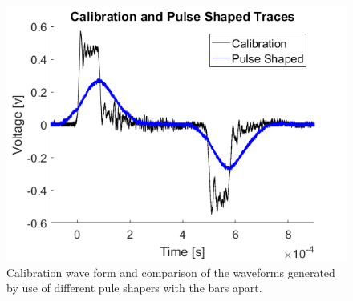 \documentclass[12pt]{article}
\begin{document}
\begin{figure}[H]
	\centering
	\includegraphics[width=.75\textwidth]{pulseshaper.png}
	\caption{Calibration wave form and  comparison of the waveforms generated by use of different pule shapers with the bars apart.}
	\label{fig:pulseshaper}
\end{figure}
\end{document}
